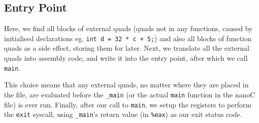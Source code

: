 \documentclass{article}
\begin{document}
\subsection{Entry Point}{
	Here, we find all blocks of external quads (quads not in any functions, caused by initialised declarations eg. \verb|int d = 32 * c + 5;|) and also all blocks of function quads as a side effect, storing them for later. Next, we translate all the external quads into assembly code, and write it into the entry point, after which we call \verb|main|.\bigskip

	This choice means that any external quads, no matter where they are placed in the file, are evaluated before the \verb|_main| (or the actual \verb|main| function in the nanoC file) is ever run. Finally, after our call to \verb|main|, we setup the registers to perform the \verb|exit| syscall, using \verb|_main|'s return value (in \verb|%eax|) as our exit status code.
}
\end{document}
